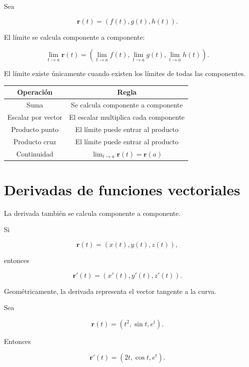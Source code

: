 Sea

\[
\mathbf{r}(t)=
(f(t),g(t),h(t)).
\]

El límite se calcula componente a componente:

\[
\boxed{
\lim_{t\to a}\mathbf{r}(t)
=
\left(
\lim_{t\to a}f(t),
\lim_{t\to a}g(t),
\lim_{t\to a}h(t)
\right).
}
\]

El límite existe únicamente cuando existen los límites de todas las componentes.

\bigskip

\begin{center}
\begin{tabular}{|c|c|}
\hline
Operación & Regla\\
\hline
Suma & Se calcula componente a componente\\
\hline
Escalar por vector & El escalar multiplica cada componente\\
\hline
Producto punto & El límite puede entrar al producto\\
\hline
Producto cruz & El límite puede entrar al producto\\
\hline
Continuidad & $\displaystyle \lim_{t\to a}\mathbf{r}(t)=\mathbf{r}(a)$\\
\hline
\end{tabular}
\end{center}

\section{Derivadas de funciones vectoriales}

La derivada también se calcula componente a componente.

Si

\[
\mathbf{r}(t)=\left(x(t),y(t),z(t)\right),
\]

entonces

\[
\mathbf{r}'(t)=
\left(
x'(t),
y'(t),
z'(t)
\right).
\]

Geométricamente, la derivada representa el vector tangente a la curva.

\begin{ejemplo}

Sea

\[
\mathbf{r}(t)=
\left(
t^{2},
\sin t,
e^{t}
\right).
\]

Entonces

\[
\mathbf{r}'(t)=
\left(
2t,
\cos t,
e^{t}
\right).
\]
\end{ejemplo}

